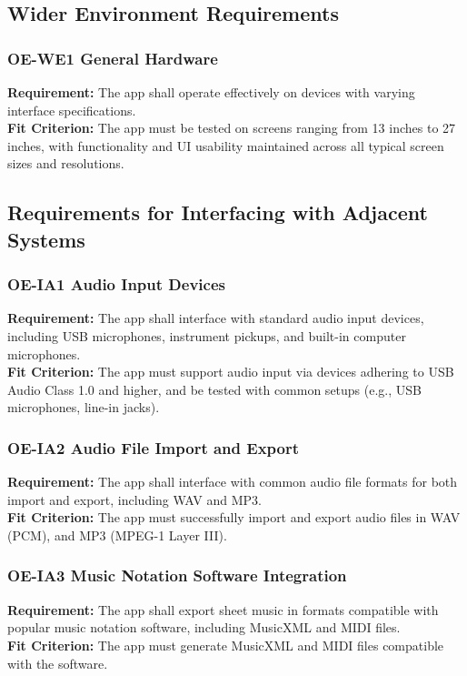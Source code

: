 \documentclass[12pt]{article}
\begin{document}
\subsection{Wider Environment Requirements}
\subsubsection*{OE-WE1 General Hardware}
\textbf{Requirement:} The app shall operate effectively on devices with varying interface specifications.\\
\textbf{Fit Criterion:} The app must be tested on screens ranging from 13 inches to 27 inches, with functionality and UI usability maintained across all typical screen sizes and resolutions.

\subsection{Requirements for Interfacing with Adjacent Systems}
\subsubsection*{OE-IA1 Audio Input Devices}
\textbf{Requirement:} The app shall interface with standard audio input devices, including USB microphones, instrument pickups, and built-in computer microphones.\\
\textbf{Fit Criterion:} The app must support audio input via devices adhering to USB Audio Class 1.0 and higher, and be tested with common setups (e.g., USB microphones, line-in jacks).\\
\subsubsection*{OE-IA2 Audio File Import and Export}
\textbf{Requirement:} The app shall interface with common audio file formats for both import and export, including WAV and MP3.\\
\textbf{Fit Criterion:} The app must successfully import and export audio files in WAV (PCM), and MP3 (MPEG-1 Layer III).\\
\subsubsection*{OE-IA3 Music Notation Software Integration}
\textbf{Requirement:} The app shall export sheet music in formats compatible with popular music notation software, including MusicXML and MIDI files.\\
\textbf{Fit Criterion:} The app must generate MusicXML and MIDI files compatible with the software.\\
\end{document}
